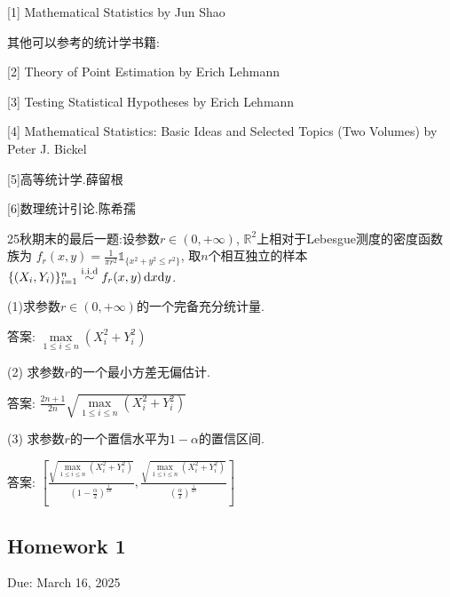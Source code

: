 [1] Mathematical Statistics by Jun Shao

其他可以参考的统计学书籍:

[2] Theory of Point Estimation by Erich Lehmann

[3] Testing Statistical Hypotheses by Erich Lehmann

[4] Mathematical Statistics: Basic Ideas and Selected Topics (Two Volumes) by Peter J. Bickel

[5]高等统计学.薛留根

[6]数理统计引论.陈希孺

25秋期末的最后一题:设参数$r\in(0,+\infty)$, $\mathbb{R}^2$上相对于Lebesgue测度的密度函数族为
$f_r(x,y)=\frac{1}{\pi r^2}\mathbb{1}_{\{x^2+y^2 \leqslant r^2\}}$,
取$n$个相互独立的样本$\{(X_i,Y_i)\}_{i=1}^n\stackrel{\rm i.i.d}{\sim}f_r(x,y)\,{\rm d}x{\rm d}y$.

(1)求参数$r\in(0,+\infty)$的一个完备充分统计量.
    
答案: $\max\limits_{1 \leqslant i \leqslant n}(X_i^2+Y_i^2)$
    
(2) 求参数$r$的一个最小方差无偏估计.
    
答案: $\frac{2n+1}{2n}\sqrt{\max\limits_{1 \leqslant i \leqslant n}(X_i^2+Y_i^2)}$
    
(3) 求参数$r$的一个置信水平为$1-\alpha$的置信区间.
    
答案: $\left[\frac{\sqrt{\max\limits_{1 \leqslant i \leqslant n}(X_i^2+Y_i^2)}}{(1-\frac{\alpha}{2})^\frac{1}{2n}},\frac{\sqrt{\max\limits_{1 \leqslant i \leqslant n}(X_i^2+Y_i^2)}}{(\frac{\alpha}{2})^\frac{1}{2n}}\right]$

\subsection*{Homework 1}

Due: March 16, 2025

